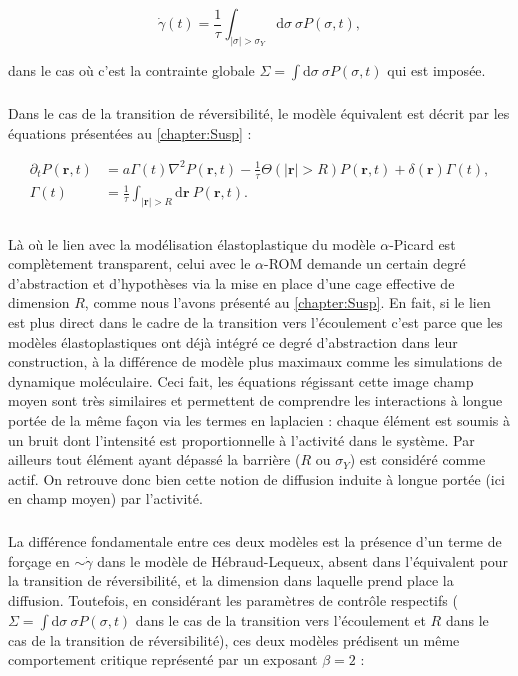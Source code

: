 \begin{equation}
	\dot{\gamma} (t) = \frac{1}{\tau}\int_{|\sigma|>\sigma_Y}\mathrm{d}\sigma ~ \sigma P(\sigma, t),
\end{equation}

\noindent dans le cas où c'est la contrainte globale $\Sigma = \int \mathrm{d}\sigma ~ \sigma P(\sigma,t)$ qui est imposée.

\subparagraph{}Dans le cas de la transition de réversibilité, le modèle équivalent est décrit par les équations présentées au \autoref{chapter:Susp} :

\begin{equation}
\begin{aligned}
    \partial_t P(\mathbf{r}, t) &= a\Gamma (t)\nabla^2 P(\mathbf{r}, t) - \frac{1}{\tau}\Theta(|\mathbf{r}|>R)P(\mathbf{r}, t) + \delta(\mathbf{r})\Gamma (t),\\
     \Gamma (t) &= \frac{1}{\tau}\int_{|\mathbf{r}|>R}\mathrm{d}\mathbf{r}~P(\mathbf{r}, t).
    \label{eq:muHLDiffdisc}
\end{aligned}
\end{equation} 

\subparagraph{}Là où le lien avec la modélisation élastoplastique du modèle $\alpha$-Picard est complètement transparent, celui avec le $\alpha$-ROM demande un certain degré d'abstraction et d'hypothèses via la mise en place d'une cage effective de dimension $R$, comme nous l'avons présenté au \autoref{chapter:Susp}. En fait, si le lien est plus direct dans le cadre de la transition vers l'écoulement c'est parce que les modèles élastoplastiques ont déjà intégré ce degré d'abstraction dans leur construction, à la différence de modèle plus maximaux comme les simulations de dynamique moléculaire. Ceci fait, les équations régissant cette image champ moyen sont très similaires et permettent de comprendre les interactions à longue portée de la même façon via les termes en laplacien : chaque élément est soumis à un bruit dont l'intensité est proportionnelle à l'activité dans le système. Par ailleurs tout élément ayant dépassé la barrière ($R$ ou $\sigma_Y$) est considéré comme actif. On retrouve donc bien cette notion de diffusion induite à longue portée (ici en champ moyen) par l'activité.

\subparagraph{}La différence fondamentale entre ces deux modèles est la présence d'un terme de forçage en $\sim \dot{\gamma}$ dans le modèle de Hébraud-Lequeux, absent dans l'équivalent pour la transition de réversibilité, et la dimension dans laquelle prend place la diffusion. Toutefois, en considérant les paramètres de contrôle respectifs ($\Sigma = \int \mathrm{d}\sigma ~ \sigma P(\sigma,t)$ dans le cas de la transition vers l'écoulement et $R$ dans le cas de la transition de réversibilité), ces deux modèles prédisent un même comportement critique représenté par un exposant $\beta = 2$ :

